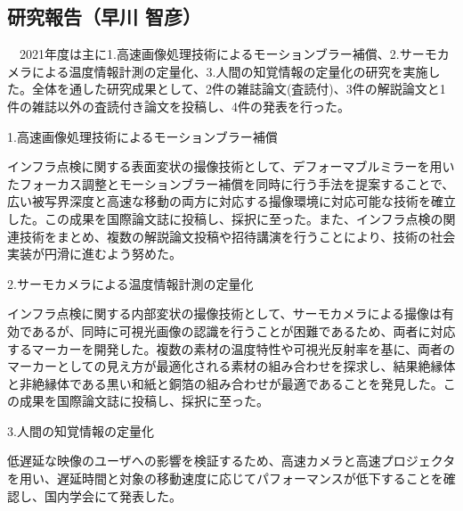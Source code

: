 \subsection{研究報告（早川 智彦）}

　2021年度は主に1.高速画像処理技術によるモーションブラー補償、2.サーモカメラによる温度情報計測の定量化、3.人間の知覚情報の定量化の研究を実施した。全体を通した研究成果として、2件の雑誌論文(査読付)、3件の解説論文と1件の雑誌以外の査読付き論文を投稿し、4件の発表を行った。

1.高速画像処理技術によるモーションブラー補償

インフラ点検に関する表面変状の撮像技術として、デフォーマブルミラーを用いたフォーカス調整とモーションブラー補償を同時に行う手法を提案することで、広い被写界深度と高速な移動の両方に対応する撮像環境に対応可能な技術を確立した。この成果を国際論文誌に投稿し、採択に至った。また、インフラ点検の関連技術をまとめ、複数の解説論文投稿や招待講演を行うことにより、技術の社会実装が円滑に進むよう努めた。

2.サーモカメラによる温度情報計測の定量化

インフラ点検に関する内部変状の撮像技術として、サーモカメラによる撮像は有効であるが、同時に可視光画像の認識を行うことが困難であるため、両者に対応するマーカーを開発した。複数の素材の温度特性や可視光反射率を基に、両者のマーカーとしての見え方が最適化される素材の組み合わせを探求し、結果絶縁体と非絶縁体である黒い和紙と銅箔の組み合わせが最適であることを発見した。この成果を国際論文誌に投稿し、採択に至った。

3.人間の知覚情報の定量化

低遅延な映像のユーザへの影響を検証するため、高速カメラと高速プロジェクタを用い、遅延時間と対象の移動速度に応じてパフォーマンスが低下することを確認し、国内学会にて発表した。
